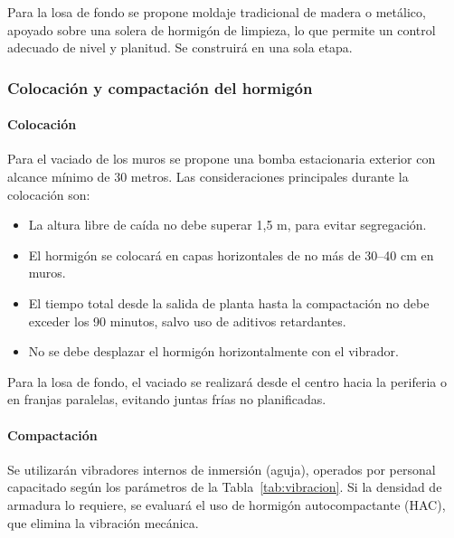 Para la losa de fondo se propone moldaje tradicional de madera o metálico, apoyado sobre una solera de hormigón de limpieza, lo que permite un control adecuado de nivel y planitud. Se construirá en una sola etapa.

\subsubsection{Colocación y compactación del hormigón}

\paragraph{Colocación}

Para el vaciado de los muros se propone una bomba estacionaria exterior con alcance mínimo de 30 metros. Las consideraciones principales durante la colocación son:

\begin{itemize}
    \item La altura libre de caída no debe superar 1{,}5 m, para evitar segregación.
    \item El hormigón se colocará en capas horizontales de no más de 30--40 cm en muros.
    \item El tiempo total desde la salida de planta hasta la compactación no debe exceder los 90 minutos, salvo uso de aditivos retardantes.
    \item No se debe desplazar el hormigón horizontalmente con el vibrador.
\end{itemize}

Para la losa de fondo, el vaciado se realizará desde el centro hacia la periferia o en franjas paralelas, evitando juntas frías no planificadas.

\paragraph{Compactación}

Se utilizarán vibradores internos de inmersión (aguja), operados por personal capacitado según los parámetros de la Tabla~\ref{tab:vibracion}. Si la densidad de armadura lo requiere, se evaluará el uso de hormigón autocompactante (HAC), que elimina la vibración mecánica.

